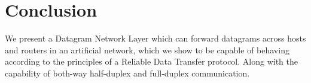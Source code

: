 \section{Conclusion}

We present a Datagram Network Layer which can forward datagrams across hosts and routers in an artificial network,
which we show to be capable of behaving according to the principles of a Reliable Data Transfer protocol.
Along with the capability of both-way half-duplex and full-duplex communication.
